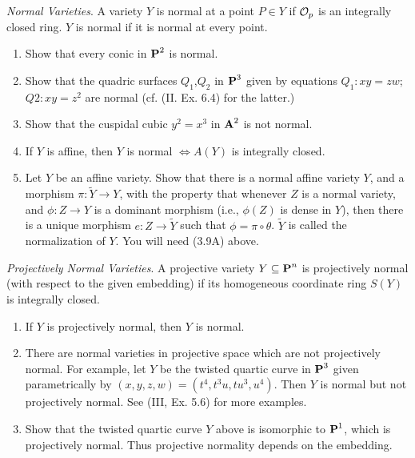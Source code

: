 \documentclass[10pt]{amsart}
\begin{document}
\begin{exercise}[3.17]
    \emph{Normal Varieties}. A variety $Y$ is normal at a point $P \in Y$ if $\cO_p$ is an integrally closed ring. 
    $Y$ is normal if it is normal at every point.
    \begin{enumerate}[itemsep=1pt]
        \item Show that every conic in $\pp^2$ is normal.
        \item Show that the quadric surfaces $Q_1$,$Q_2$ in $\pp^3$ given by equations $Q_1 :xy = zw$;
        $Q2 :xy = z^2$ are normal (cf. (II. Ex. 6.4) for the latter.)
        \item Show that the cuspidal cubic $y^2 = x^3$ in $\aa^2$ is not normal.
        \item If $Y$ is affine, then $Y$ is normal $\iff A(Y)$ is integrally closed.
        \item Let $Y$ be an affine variety. Show that there is a normal affine variety $Y$, and a
        morphism $\pi: \tilde{Y} \to Y$, with the property that whenever $Z$ is a normal variety, and 
        $\phi : Z \to Y$ is a dominant morphism (i.e., $\phi(Z)$ is dense in $Y$), then there is a unique 
        morphism $e:Z \to \tilde{Y}$ such that $\phi = \pi \circ \theta$. $\tilde{Y}$ is called the 
        normalization of $Y$. You will need (3.9A) above.
    \end{enumerate}
\end{exercise}

\begin{exercise}[3.18]
    \emph{Projectively Normal Varieties}. A projective variety $Y \subseteq \pp^n$ is projectively normal 
    (with respect to the given embedding) if its homogeneous coordinate ring $S(Y)$ is integrally closed.
    \begin{enumerate}[itemsep=1pt]
        \item If $Y$ is projectively normal, then $Y$ is normal.
        \item There are normal varieties in projective space which are not projectively normal. For example, let $Y$ be the 
        twisted quartic curve in $\pp^3$ given parametrically by $(x,y,z,w) = (t^4 ,t^3u,tu^3,u^4)$. Then $Y$ is normal 
        but not projectively normal. See (III, Ex. 5.6) for more examples.
        \item Show that the twisted quartic curve $Y$ above is isomorphic to $\pp^1$, which is projectively normal. 
        Thus projective normality depends on the embedding.
    \end{enumerate}
\end{exercise}
\end{document}
